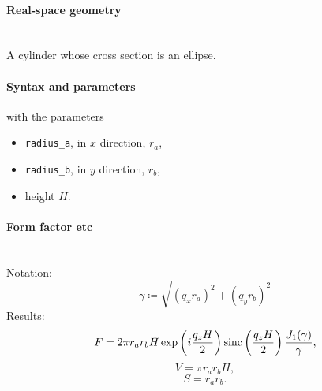 \paragraph{Real-space geometry}\strut\\
A cylinder whose cross section is an ellipse.

\begin{figure}[h]
\hfill
{}
\hfill
{}
\hfill
{}
\hfill
\end{figure}

\paragraph{Syntax and parameters}
\begin{quote}
\end{quote}
with the parameters
\begin{itemize}
\item \texttt{radius\_a}, in $x$ direction, $r_a$,
\item \texttt{radius\_b}, in $y$ direction, $r_b$,
\item height $H$.
\end{itemize}


\paragraph{Form factor etc}\strut\\
Notation:
\begin{equation*}
  \gamma \coloneqq \sqrt{(q_x r_a)^2+(q_y r_b)^2}  
\end{equation*}
Results:
\begin{equation*}
F = 2\pi r_a r_b H \exp\left(i\frac{q_z H}{2}\right)
   \operatorname{sinc}\left(\frac{q_z H}{2}\right) \frac{J_1(\gamma)}{\gamma},
\end{equation*}
\begin{equation*}
  V = \pi r_a r_bH,
\end{equation*}
\begin{equation*}
  S = r_a r_b.
\end{equation*}

